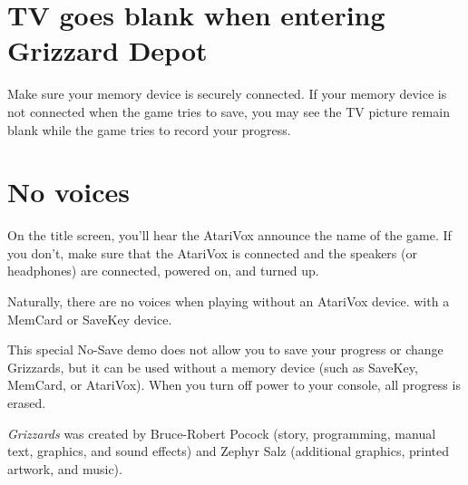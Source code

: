 \documentclass[10pt,twocolumn,openany,article]{memoir}
\begin{document}
\fi

\ifdefined\NOSAVE\else\ifdefined\ATARIAGESAVE\else

\section*{TV goes blank when entering Grizzard Depot}

Make  sure your  memory device  is  securely connected.  If your  memory
device is not connected when the game  tries to save, you may see the TV
picture remain blank while the game tries to record your progress.

\fi

\section*{No voices}

On the title  screen, you'll hear the AtariVox announce  the name of the
game. If  you don't, make  sure that the  AtariVox is connected  and the
speakers (or headphones) are connected, powered on, and turned up.

Naturally,  there are  no  voices  when playing  \ifdefined\ATARIAGESAVE
without an AtariVox device. \else with a MemCard or SaveKey device. \fi

\fi

\ifdefined\NOSAVE

\pagebreak
{}

This special  No-Save demo does not  allow you to save  your progress or
change Grizzards,  but it can be  used without a memory  device (such as
SaveKey, MemCard, or AtariVox). When you turn off power to your console,
all progress is erased.

\fi

\fi %


\vfill


\pagebreak


\textit{Grizzards}   was   created   by  Bruce-Robert   Pocock   (story,
programming, manual text,  graphics, and sound effects)  and Zephyr Salz
(additional graphics, printed artwork, and music).
\end{document}

